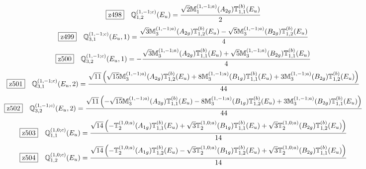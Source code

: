 \documentclass[fleqn,10pt,landscape]{jsarticle}
\begin{document}
\begin{dmath*}
\hspace*{3mm}\fbox{z498}\quad \mathbb{Q}_{1,2}^{(1,-1;c)}(E_{u})=\frac{\sqrt{2} \mathbb{M}_{1}^{(1,-1;a)}(A_{2g}) \mathbb{T}_{1,1}^{(b)}(E_{u})}{2}
\end{dmath*}
\begin{dmath*}
\hspace*{3mm}\fbox{z499}\quad \mathbb{Q}_{3,1}^{(1,-1;c)}(E_{u},1)=\frac{\sqrt{3} \mathbb{M}_{3}^{(1,-1;a)}(A_{2g}) \mathbb{T}_{1,2}^{(b)}(E_{u}) - \sqrt{5} \mathbb{M}_{3}^{(1,-1;a)}(B_{2g}) \mathbb{T}_{1,2}^{(b)}(E_{u})}{4}
\end{dmath*}
\begin{dmath*}
\hspace*{3mm}\fbox{z500}\quad \mathbb{Q}_{3,2}^{(1,-1;c)}(E_{u},1)=- \frac{\sqrt{3} \mathbb{M}_{3}^{(1,-1;a)}(A_{2g}) \mathbb{T}_{1,1}^{(b)}(E_{u}) + \sqrt{5} \mathbb{M}_{3}^{(1,-1;a)}(B_{2g}) \mathbb{T}_{1,1}^{(b)}(E_{u})}{4}
\end{dmath*}
\begin{dmath*}
\hspace*{3mm}\fbox{z501}\quad \mathbb{Q}_{3,1}^{(1,-1;c)}(E_{u},2)=\frac{\sqrt{11} \left(\sqrt{15} \mathbb{M}_{3}^{(1,-1;a)}(A_{2g}) \mathbb{T}_{1,2}^{(b)}(E_{u}) + 8 \mathbb{M}_{3}^{(1,-1;a)}(B_{1g}) \mathbb{T}_{1,1}^{(b)}(E_{u}) + 3 \mathbb{M}_{3}^{(1,-1;a)}(B_{2g}) \mathbb{T}_{1,2}^{(b)}(E_{u})\right)}{44}
\end{dmath*}
\begin{dmath*}
\hspace*{3mm}\fbox{z502}\quad \mathbb{Q}_{3,2}^{(1,-1;c)}(E_{u},2)=\frac{\sqrt{11} \left(- \sqrt{15} \mathbb{M}_{3}^{(1,-1;a)}(A_{2g}) \mathbb{T}_{1,1}^{(b)}(E_{u}) - 8 \mathbb{M}_{3}^{(1,-1;a)}(B_{1g}) \mathbb{T}_{1,2}^{(b)}(E_{u}) + 3 \mathbb{M}_{3}^{(1,-1;a)}(B_{2g}) \mathbb{T}_{1,1}^{(b)}(E_{u})\right)}{44}
\end{dmath*}
\begin{dmath*}
\hspace*{3mm}\fbox{z503}\quad \mathbb{Q}_{1,1}^{(1,0;c)}(E_{u})=\frac{\sqrt{14} \left(- \mathbb{T}_{2}^{(1,0;a)}(A_{1g}) \mathbb{T}_{1,1}^{(b)}(E_{u}) + \sqrt{3} \mathbb{T}_{2}^{(1,0;a)}(B_{1g}) \mathbb{T}_{1,1}^{(b)}(E_{u}) + \sqrt{3} \mathbb{T}_{2}^{(1,0;a)}(B_{2g}) \mathbb{T}_{1,2}^{(b)}(E_{u})\right)}{14}
\end{dmath*}
\begin{dmath*}
\hspace*{3mm}\fbox{z504}\quad \mathbb{Q}_{1,2}^{(1,0;c)}(E_{u})=\frac{\sqrt{14} \left(- \mathbb{T}_{2}^{(1,0;a)}(A_{1g}) \mathbb{T}_{1,2}^{(b)}(E_{u}) - \sqrt{3} \mathbb{T}_{2}^{(1,0;a)}(B_{1g}) \mathbb{T}_{1,2}^{(b)}(E_{u}) + \sqrt{3} \mathbb{T}_{2}^{(1,0;a)}(B_{2g}) \mathbb{T}_{1,1}^{(b)}(E_{u})\right)}{14}
\end{dmath*}
\end{document}
